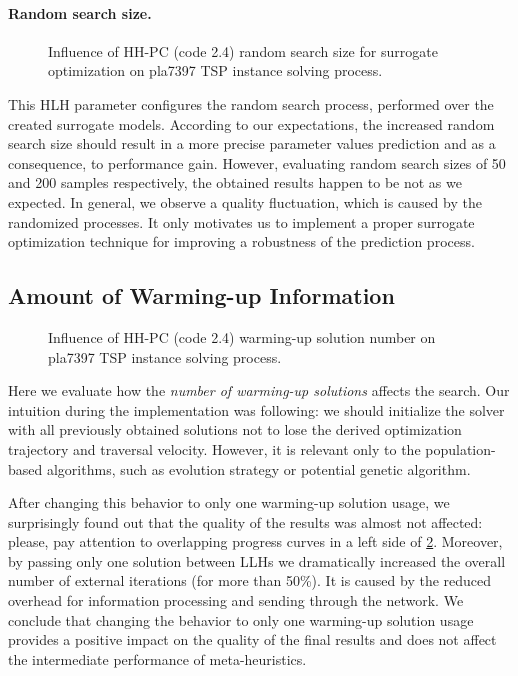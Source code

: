 \paragraph{Random search size.}
\begin{figure}[h]
	\centering
	\vspace{-10pt}
	
	\caption{Influence of HH-PC (code 2.4) random search size for surrogate optimization on pla7397 TSP instance solving process.}
	\vspace{-5pt}
	\label{eval:2:pict: random search size}
\end{figure}
This HLH parameter configures the random search process, performed over the created surrogate models. According to our expectations, the increased random search size should result in a more precise parameter values prediction and as a consequence, to performance gain. However, evaluating random search sizes of 50 and 200 samples respectively, the obtained results happen to be not as we expected. In general, we observe a quality fluctuation, which is caused by the randomized processes. It only motivates us to implement a proper surrogate optimization technique for improving a robustness of the prediction process.

\subsection{Amount of Warming-up Information}\label{eval:2:llh changes}
\begin{figure}[h]
	\centering
	\vspace{-10pt}
	
	\caption{Influence of HH-PC (code 2.4) warming-up solution number on pla7397 TSP instance solving process.}
	\vspace{-5pt}
	\label{eval:2:pict:warming-up solutions}
\end{figure}
Here we evaluate how the \emph{number of warming-up solutions} affects the search. Our intuition during the implementation was following: we should initialize the solver with all previously obtained solutions not to lose the derived optimization trajectory and traversal velocity. However, it is relevant only to the population-based algorithms, such as evolution strategy or potential genetic algorithm.

After changing this behavior to only one warming-up solution usage, we surprisingly found out that the quality of the results was almost not affected: please, pay attention to overlapping progress curves in a left side of \cref{eval:2:pict:warming-up solutions}. Moreover, by passing only one solution between LLHs we dramatically increased the overall number of external iterations (for more than 50\%). It is caused by the reduced overhead for information processing and sending through the network. We conclude that changing the behavior to only one warming-up solution usage provides a positive impact on the quality of the final results and does not affect the intermediate performance of meta-heuristics.



